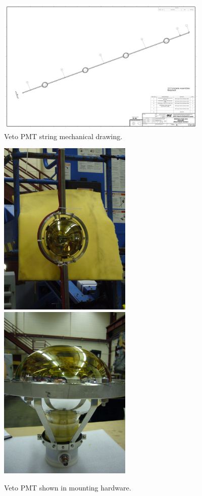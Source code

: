 \documentclass{JINST}
\begin{document}
\begin{figure}[ht]
\begin{center}
\includegraphics[width=4in,angle=0]{graphics/vetopmtstring.pdf}
\caption{Veto PMT string mechanical drawing.
\label{fig:vetopmtstring}}
\end{center}
\end{figure}

\begin{figure}[ht]
\begin{center}
		\includegraphics[width=2.5in]{graphics/singlepmtmounted1.JPG}
		\includegraphics[width=2.5in]{graphics/singlepmtmounted2.JPG}
\caption{Veto PMT shown in mounting hardware.
\label{fig:vetopmtmountpic}}
\end{center}
\end{figure}
\end{document}
